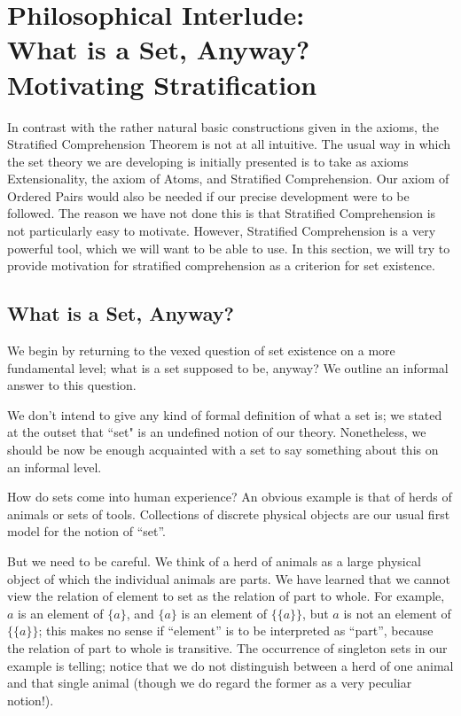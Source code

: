 \chapter[Philosophical Interlude]{Philosophical
Interlude:\\  What is a Set, Anyway?\\ Motivating Stratification}

In contrast with the rather natural basic constructions given in the
axioms, the Stratified Comprehension Theorem is not at all intuitive.
The usual way in which the set theory we are developing is initially
presented is to take as axioms Extensionality, the axiom
of Atoms, and 
Stratified Comprehension.  Our axiom of
Ordered Pairs would also be 
needed if our precise development were to be followed.  The reason we
have not done this is that Stratified Comprehension is not
particularly easy to motivate.  However, Stratified
Comprehension is a
very powerful tool, which we will want to be able to use.  In this
section, we will try to provide motivation for stratified
comprehension as a criterion for set existence.



\section{What is a Set, Anyway?}

We begin by returning to the vexed question of set existence on a more
fundamental level; what is a set supposed to be, anyway?  We outline
an informal answer to this question.

We don't intend to give any kind of formal definition of what a set
is; we stated at the outset that ``set" is an undefined notion of our
theory.  Nonetheless, we should be now be enough acquainted with a set
to say something about this on an informal level.

How do sets come into human experience?  An obvious example is that of
herds of animals or sets of tools.  Collections of discrete physical
objects are our usual first model for the notion of ``set''.  

But we need to be careful.  We think of a herd of animals as a large
physical object of which the individual animals are parts.  We have
learned that we cannot view the relation of element to set as
the relation of part to whole.  For example,
$a$ is an element of $\{a\}$,
and $\{a\}$ is an element of $\{\{a\}\}$, but $a$ is not an element of
$\{\{a\}\}$; this makes no sense if ``element'' is to be interpreted
as ``part'', because the relation of part to whole is transitive.  The
occurrence of singleton sets in our example is telling; notice
that we do not distinguish between a herd of one animal and that single animal
(though we do regard the former as a very peculiar notion!).  


